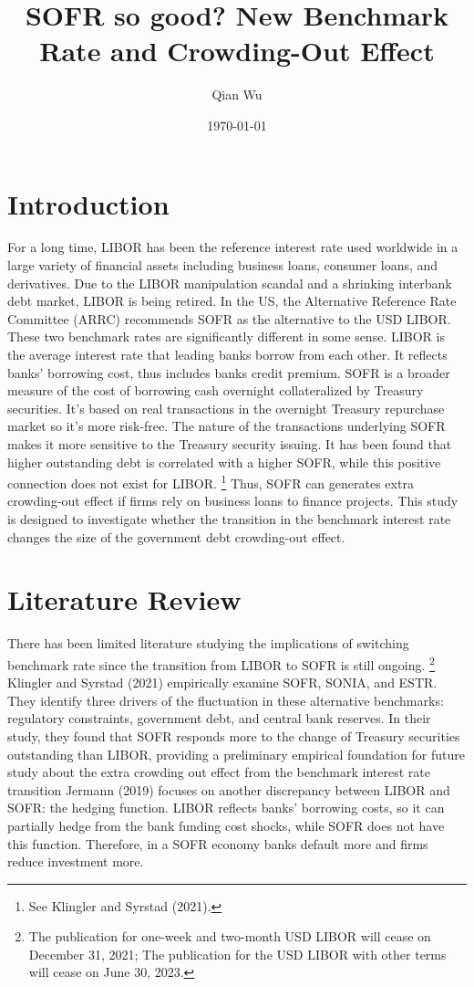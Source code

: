 \documentclass[12pt]{article}
\title{SOFR so good? New Benchmark Rate and Crowding-Out Effect}
\author{Qian Wu \\
}
\date{\today}
\newcommand{\tab}{\hspace*{2em}} %
\begin{document}
\maketitle


\section{Introduction}
\tab For a long time,  LIBOR has been the reference interest rate used worldwide in a large variety of financial assets including business loans,  consumer loans,  and derivatives.  Due to the LIBOR manipulation scandal and a shrinking interbank debt market,  LIBOR is being retired.  In the US,  the Alternative Reference Rate Committee (ARRC) recommends SOFR as the alternative to the USD LIBOR.  \\
\tab These two benchmark rates are significantly different in some sense.  LIBOR is the average interest rate that leading banks borrow from each other.  It reflects banks' borrowing cost,  thus includes banks credit premium.  SOFR is a broader measure of the cost of borrowing cash overnight collateralized by Treasury securities.  It's based on real transactions in the overnight Treasury repurchase market so it's more risk-free.  The nature of the transactions underlying SOFR makes it more sensitive to the Treasury security issuing.  It has been found that higher outstanding debt is correlated with a higher SOFR,  while this positive connection does not exist for LIBOR. \footnote{See Klingler and Syrstad (2021).} Thus, SOFR can generates extra crowding-out effect if firms rely on business loans to finance projects.  This study is designed to investigate whether the transition in the benchmark interest rate changes the size of the government debt crowding-out effect.
 
 \section{Literature Review}
\tab There has been limited literature studying the implications of switching benchmark rate since the transition from LIBOR to SOFR is still ongoing. \footnote{The publication for one-week and two-month USD LIBOR will cease on December 31, 2021; The publication for the USD LIBOR with other terms will cease on June 30, 2023.} Klingler and Syrstad (2021) empirically examine SOFR, SONIA, and ESTR. They identify three drivers of the fluctuation in these alternative benchmarks: regulatory constraints, government debt, and central bank reserves.  In their study,  they found that SOFR responds more to the change of Treasury securities outstanding than LIBOR,  providing a preliminary empirical foundation for future study about the extra crowding out effect from the benchmark interest rate transition  Jermann (2019) focuses on another discrepancy between LIBOR and SOFR: the hedging function.  LIBOR reflects banks' borrowing costs,  so it can partially hedge from the bank funding cost shocks,  while SOFR does not have this function.  Therefore, in a SOFR economy banks default more and firms reduce investment more.  
\end{document}
